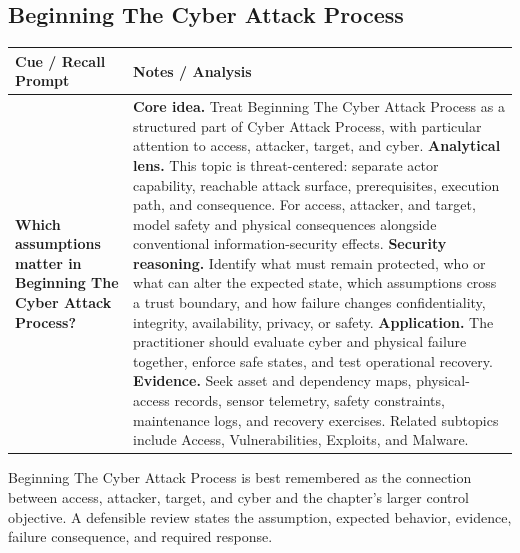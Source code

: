 \documentclass[11pt]{article}
\newcommand{\CornellHeader}{%
\rowcolor{Navy}\color{white}\bfseries Cue / Recall Prompt & \color{white}\bfseries Notes / Analysis\\\hline}
\newcommand{\CornellRow}[2]{%
\cellcolor{CueGray}\RaggedRight\textbf{#1} & \RaggedRight #2\\\hline}
\begin{document}
\subsection*{Beginning The Cyber Attack Process}
\begin{longtable}{>{\RaggedRight\arraybackslash}p{}|>{\RaggedRight\arraybackslash}p{}}
\CornellHeader
\CornellRow{Which assumptions matter in Beginning The Cyber Attack Process?}{\textbf{Core idea.} Treat Beginning The Cyber Attack Process as a structured part of Cyber Attack Process, with particular attention to access, attacker, target, and cyber. \textbf{Analytical lens.} This topic is threat-centered: separate actor capability, reachable attack surface, prerequisites, execution path, and consequence. For access, attacker, and target, model safety and physical consequences alongside conventional information-security effects. \textbf{Security reasoning.} Identify what must remain protected, who or what can alter the expected state, which assumptions cross a trust boundary, and how failure changes confidentiality, integrity, availability, privacy, or safety. \textbf{Application.} The practitioner should evaluate cyber and physical failure together, enforce safe states, and test operational recovery. \textbf{Evidence.} Seek asset and dependency maps, physical-access records, sensor telemetry, safety constraints, maintenance logs, and recovery exercises. Related subtopics include Access, Vulnerabilities, Exploits, and Malware.}
\end{longtable}
\begin{topicsummary}
Beginning The Cyber Attack Process is best remembered as the connection between access, attacker, target, and cyber and the chapter's larger control objective. A defensible review states the assumption, expected behavior, evidence, failure consequence, and required response.
\end{topicsummary}
\end{document}

